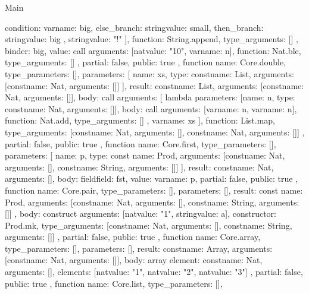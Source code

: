 \begin{lexlean}{Main}
\begin{toolingmodule}
{{{{{              condition: var{name: big},
              else_branch: string{value: small},
              then_branch: string{value: big}
            },
            string{value: "!"}
          ],
          function: String.append,
          type_arguments: []
        },
        binder: big,
        value: call{
          arguments: [nat{value: "10"}, var{name: n}],
          function: Nat.ble,
          type_arguments: []
        }
      },
      partial: false,
      public: true
    },
    function{
      name: Core.double,
      type_parameters: [],
      parameters: [
        {name: xs, type: const{name: List, arguments: [const{name: Nat, arguments: []}]}}
      ],
      result: const{name: List, arguments: [const{name: Nat, arguments: []}]},
      body: call{
        arguments: [
          lambda{
            parameters: [{name: n, type: const{name: Nat, arguments: []}}],
            body: call{
              arguments: [var{name: n}, var{name: n}],
              function: Nat.add,
              type_arguments: []
            }
          },
          var{name: xs}
        ],
        function: List.map,
        type_arguments: [const{name: Nat, arguments: []}, const{name: Nat, arguments: []}]
      },
      partial: false,
      public: true
    },
    function{
      name: Core.first,
      type_parameters: [],
      parameters: [
        {
          name: p,
          type: const{
            name: Prod,
            arguments: [const{name: Nat, arguments: []}, const{name: String, arguments: []}]
          }
        }
      ],
      result: const{name: Nat, arguments: []},
      body: field{field: fst, value: var{name: p}},
      partial: false,
      public: true
    },
    function{
      name: Core.pair,
      type_parameters: [],
      parameters: [],
      result: const{
        name: Prod,
        arguments: [const{name: Nat, arguments: []}, const{name: String, arguments: []}]
      },
      body: construct{
        arguments: [nat{value: "1"}, string{value: a}],
        constructor: Prod.mk,
        type_arguments: [const{name: Nat, arguments: []}, const{name: String, arguments: []}]
      },
      partial: false,
      public: true
    },
    function{
      name: Core.array,
      type_parameters: [],
      parameters: [],
      result: const{name: Array, arguments: [const{name: Nat, arguments: []}]},
      body: array{
        element: const{name: Nat, arguments: []},
        elements: [nat{value: "1"}, nat{value: "2"}, nat{value: "3"}]
      },
      partial: false,
      public: true
    },
    function{
      name: Core.list,
      type_parameters: [],
}}
\end{toolingmodule}
\end{lexlean}
